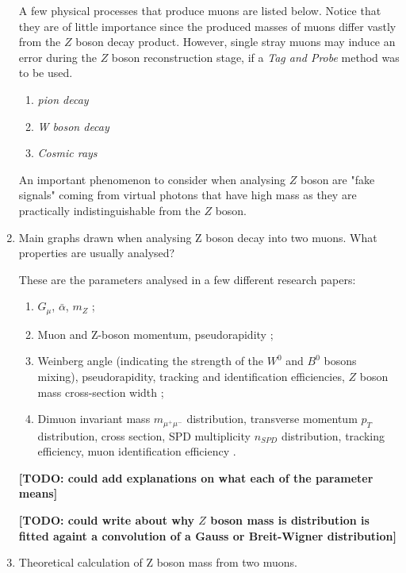 \documentclass[11pt,a4paper,twoside]{article}
\begin{document}
\begin{enumerate}
        A few physical processes that produce muons are listed below. Notice that they are of little importance since the produced masses of muons differ vastly from the $Z$ boson decay product. However, single stray muons may induce an error during the $Z$ boson reconstruction stage, if a \textit{Tag and Probe} method was to be used.

        \begin{enumerate}
            \item \textit{pion decay}
            \item \textit{W boson decay}
            \item \textit{Cosmic rays}
        \end{enumerate}


        An important phenomenon to consider when analysing $Z$ boson are "fake signals" coming from virtual photons that have high mass as they are practically indistinguishable from the $Z$ boson.

        
        \item Main graphs drawn when analysing Z boson decay into two muons. What properties are usually analysed?


        These are the parameters analysed in a few different research papers:
        \begin{enumerate}
            \item $G_{\mu}$, $\bar{\alpha}$, $m_Z$ \cite{novikov1999theory};
            \item Muon and Z-boson momentum, pseudorapidity \cite{khodaverdian2019accuracy};
            \item Weinberg angle (indicating the strength of the $W^0$ and $B^0$ bosons mixing), pseudorapidity, tracking and identification efficiencies, $Z$ boson mass cross-section width \cite{ATLAS_Z_lab};
            \item Dimuon invariant mass $m_{\mu^{+} \mu^{-}}$ distribution, transverse momentum $p_T$ distribution, cross section, SPD multiplicity $n_{SPD}$ distribution, tracking efficiency, muon identification efficiency \cite{Bursche:2014ltl}.
        \end{enumerate}
        
        \textbf{[TODO: could add explanations on what each of the parameter means]}

        \textbf{[TODO: could write about why $Z$ boson mass is distribution is fitted againt a convolution of a Gauss or Breit-Wigner distribution]}


        \item Theoretical calculation of Z boson mass from two muons.



\end{enumerate}
\end{document}
